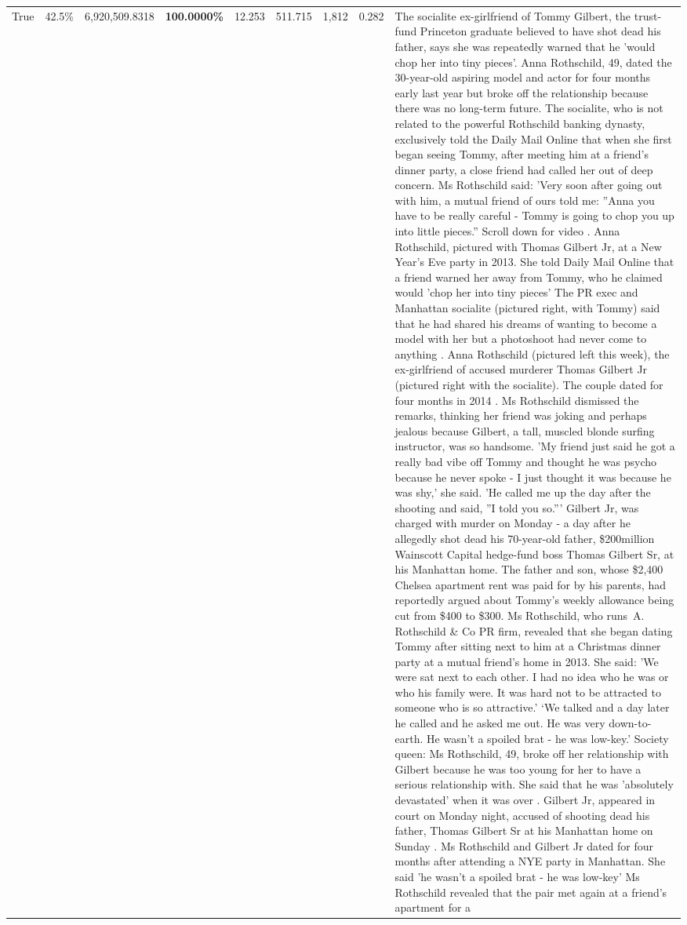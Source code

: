 \begin{table}[H]
\begin{tabular}{lllrlllll}
True & 42.5\% & 6,920,509.8318 & \bfseries \color{red} 100.0000\% & 12.253 & 511.715 & 1,812 & 0.282 & The socialite ex-girlfriend of Tommy Gilbert, the trust-fund Princeton graduate believed to have shot dead his father, says she was repeatedly warned that he 'would chop her into tiny pieces'. Anna Rothschild, 49, dated the 30-year-old aspiring model and actor for four months early last year but broke off the relationship because there was no long-term future. The socialite, who is not related to the powerful Rothschild banking dynasty, exclusively told the Daily Mail Online that when she first began seeing Tommy, after meeting him at a friend's dinner party, a close friend had called her out of deep concern. Ms Rothschild said: 'Very soon after going out with him, a mutual friend of ours told me: ''Anna you have to be really careful - Tommy is going to chop you up into little pieces.'' Scroll down for video . Anna Rothschild, pictured with Thomas Gilbert Jr, at a New Year's Eve party in 2013. She told Daily Mail Online that a friend warned her away from Tommy, who he claimed would 'chop her into tiny pieces' The PR exec and Manhattan socialite (pictured right, with Tommy) said that he had shared his dreams of wanting to become a model with her but a photoshoot had never come to anything . Anna Rothschild (pictured left this week), the ex-girlfriend of accused murderer Thomas Gilbert Jr (pictured right with the socialite). The couple dated for four months in 2014 . Ms Rothschild dismissed the remarks, thinking her friend was joking and perhaps jealous because Gilbert, a tall, muscled blonde surfing instructor, was so handsome. 'My friend just said he got a really bad vibe off Tommy and thought he was psycho because he never spoke - I just thought it was because he was shy,' she said. 'He called me up the day after the shooting and said, ''I told you so.''' Gilbert Jr, was charged with murder on Monday - a day after he allegedly shot dead his 70-year-old father, \$200million Wainscott Capital hedge-fund boss Thomas Gilbert Sr, at his Manhattan home. The father and son, whose \$2,400 Chelsea apartment rent was paid for by his parents, had reportedly argued about Tommy's weekly allowance being cut from \$400 to \$300. Ms Rothschild, who runs A. Rothschild \& Co PR firm, revealed that she began dating Tommy after sitting next to him at a Christmas dinner party at a mutual friend's home in 2013. She said: 'We were sat next to each other. I had no idea who he was or who his family were. It was hard not to be attracted to someone who is so attractive.' ‘We talked and a day later he called and he asked me out. He was very down-to-earth. He wasn’t a spoiled brat - he was low-key.’ Society queen: Ms Rothschild, 49, broke off her relationship with Gilbert because he was too young for her to have a serious relationship with. She said that he was 'absolutely devastated' when it was over . Gilbert Jr, appeared in court on Monday night, accused of shooting dead his father, Thomas Gilbert Sr at his Manhattan home on Sunday . Ms Rothschild and Gilbert Jr dated for four months after attending a NYE party in Manhattan. She said 'he wasn't a spoiled brat - he was low-key' Ms Rothschild revealed that the pair met again at a friend’s apartment for a 
\end{tabular}
\end{table}
